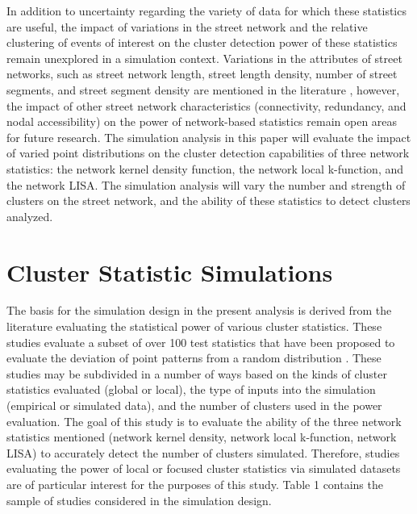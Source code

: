 \documentclass[12pt, letterpaper]{article}
\begin{document}
In addition to uncertainty regarding the variety of data for which these statistics are useful, the impact of variations in the street network and the relative clustering of events of interest on the cluster detection power of these statistics remain unexplored in a simulation context. Variations in the attributes of street networks, such as street network length, street length density, number of street segments, and street segment density are mentioned in the literature \citep{yamada2004comparison, luchen2007false}, however, the impact of other street network characteristics (connectivity, redundancy, and nodal accessibility) on the power of network-based statistics remain open areas for future research. The simulation analysis in this paper will evaluate the impact of varied point distributions on the cluster detection capabilities of three network statistics: the network kernel density function, the network local k-function, and the network LISA. The simulation analysis will vary the number and strength of clusters on the street network, and the ability of these statistics to detect clusters analyzed.
	
\section{Cluster Statistic Simulations}
The basis for the simulation design in the present analysis is derived from the literature evaluating the statistical power of various cluster statistics. These studies evaluate a subset of over 100 test statistics that have been proposed to evaluate the deviation of point patterns from a random distribution \citep{kulldorff2006tests}. These studies may be subdivided in a number of ways based on the kinds of cluster statistics evaluated (global or local), the type of inputs into the simulation (empirical or simulated data), and the number of clusters used in the power evaluation. The goal of this study is to evaluate the ability of the three network statistics mentioned (network kernel density, network local k-function, network LISA) to accurately detect the number of clusters simulated. Therefore, studies evaluating the power of local or focused cluster statistics via simulated datasets are of particular interest for the purposes of this study. Table 1 contains the sample of studies considered in the simulation design.
\end{document}

